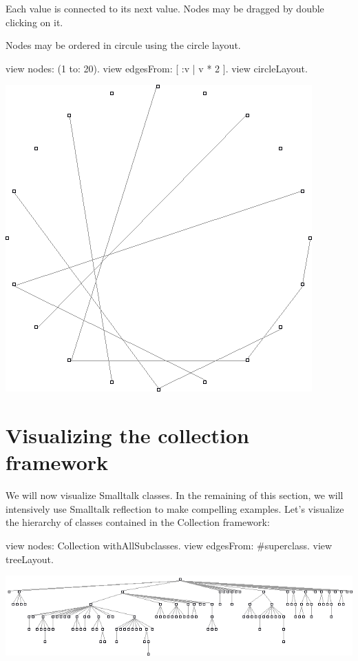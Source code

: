 \documentclass[a4paper,10pt,twoside]{book}
\begin{document}
Each value is connected to its next value. Nodes may be dragged by double clicking on it.

Nodes may be ordered in circule using the circle layout.

\begin{code}{}
view nodes: (1 to: 20).
view edgesFrom: [ :v | v * 2 ].
view circleLayout.
\end{code}
\begin{center}\includegraphics[scale=0.4]{picture3}\end{center}


\section{Visualizing the collection framework}
We will now visualize Smalltalk classes. In the remaining of this section, we will intensively use Smalltalk reflection to make compelling examples. Let's visualize the hierarchy of classes contained in the Collection framework:

\begin{code}{}
view nodes: Collection withAllSubclasses.
view edgesFrom: #superclass.
view treeLayout.
\end{code}
\begin{center}\includegraphics[scale=0.4]{picture4}\end{center}
\end{document}
